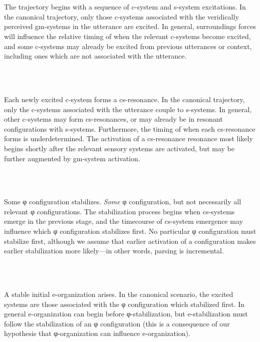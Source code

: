 \ea%
    \label{ex:key:1}
    \gll\\
        \\
    \glt
    \z

         The trajectory begins with a sequence of c-system and s-system excitations. In the canonical trajectory, only those c-systems associated with the veridically perceived gm-systems in the utterance are excited. In general, surroundings forces will influence the relative timing of when the relevant c-systems become excited, and some c-systems may already be excited from previous utterances or context, including ones which are not associated with the utterance. 

\ea%
    \label{ex:key:2}
    \gll\\
        \\
    \glt
    \z

         Each newly excited c-system forms a cs-resonance. In the canonical trajectory, only the c-systems associated with the utterance couple to s-systems. In general, other c-systems may form cs-resonances, or may already be in resonant configurations with s-systems. Furthermore, the timing of when each cs-resonance forms is underdetermined. The activation of a cs-resonance resonance most likely begins shortly after the relevant sensory systems are activated, but may be further augmented by gm-system activation.

\ea%
    \label{ex:key:3}
    \gll\\
        \\
    \glt
    \z

         Some φ configuration stabilizes. \textit{Some} φ configuration, but not necessarily all relevant φ configurations. The stabilization process begins when cs-systems emerge in the previous stage, and the timecourse of cs-system emergence may influence which φ configuration stabilizes first. No particular φ configuration must stabilize first, although we assume that earlier activation of a configuration makes earlier stabilization more likely—in other words, parsing is incremental. 

\ea%
    \label{ex:key:4}
    \gll\\
        \\
    \glt
    \z

         A stable initial e-organization arises. In the canonical scenario, the excited systems are those associated with the φ configuration which stabilized first. In general e-organization can begin before φ-stabilization, but e-stabilization must follow the stabilization of an φ configuration (this is a consequence of our hypothesis that φ-organization can influence e-organization). 

